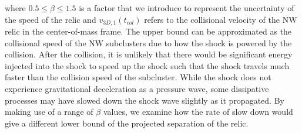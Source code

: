 where $0.5 \leq \beta \leq 1.5$ is a factor that we introduce to represent the
uncertainty of the speed of the relic and $v_{3D,1}(t_{col})$ refers to the collisional velocity of
the NW relic in the center-of-mass frame. The upper bound can be
approximated as the collisional speed of the NW subclusters due to how the
shock is powered by the collision. After the collision, it is unlikely that
there would be significant energy injected into the shock to speed up the
shock such that the shock travels much faster than the collision speed of the subcluster. While the shock does not experience gravitational deceleration as a
pressure wave, some dissipative processes may have slowed down the shock
wave slightly as it propagated. By making use of a
range of $\beta$ values, we examine how the rate of slow down would
give a different lower bound of the projected separation of the relic.   
\par      
